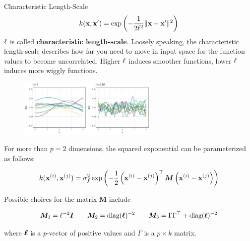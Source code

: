 \begin{frame}[c,allowframebreaks]{Characteristic Length-Scale}
    $$k(\mathbf{x}, \mathbf{x}^\prime) = \exp\left(-\frac{1}{2\ell^2}\|\mathbf{x} - \mathbf{x}^\prime\|^2\right)$$
$\ell$ is called \textbf{characteristic length-scale}. Loosely speaking, the characteristic length-scale describes how far you need to move in input space for the function values to become uncorrelated. Higher $\ell$ induces smoother functions, lower $\ell$ induces more wiggly functions.

\begin{figure}
\includegraphics[width=0.6\textwidth]{figure_man/gp-sqexp-l-1.pdf}
\end{figure}


\framebreak

For more than $p = 2$ dimensions, the squared exponential can be parameterized as follows:

$$
k(\mathbf{x}^{(i)}, \mathbf{x}^{(j)}) = \sigma^2_f \exp\,\biggl(- \frac{1}{2}\left(\mathbf{x}^{(i)} - \mathbf{x}^{(j)}\right)^\top\bm{M}\left(\mathbf{x}^{(i)} - \mathbf{x}^{(j)}\right)\biggr)
$$

\vspace{7mm}

Possible choices for the matrix $\bm{M}$ include

$$
\bm{M}_1 = \ell^{-2}\boldsymbol{I} \qquad \bm{M}_2 = \text{diag}(\bm{\ell})^{-2} \qquad \bm{M}_3 = \Gamma \Gamma^\top + \text{diag}(\bm{\ell})^{-2}
$$

where $\bm{\ell}$ is a $p$-vector of positive values and $\Gamma$ is a $p \times k$ matrix. 


\end{frame}

